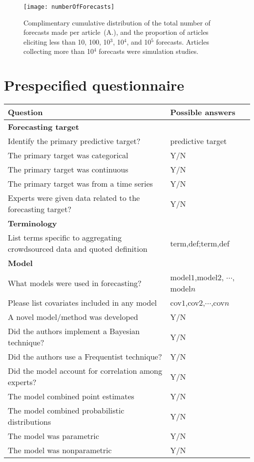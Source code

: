 \documentclass[preprint]{elsarticle}
\begin{document}
\graphicspath{{../_G/F6/}}
\begin{figure*}[ht!]
  \centering
  \texttt{[image: numberOfForecasts]}
  \caption{
Complimentary cumulative distribution of the total number of forecasts made per article~(A.), and 
the proportion of articles eliciting less than 10, 100, 10$^{3}$, 10$^{4}$, and 10$^{5}$ forecasts.
Articles collecting more than 10$^{4}$ forecasts were simulation studies.
  \label{fig.numForecasts}}
\end{figure*}


\appendix
\section{Prespecified questionnaire}
\label{suppl.prespec}

\begin{table*}[ht!]
  \begin{tabular}{ll}
    \hline
    Question & Possible answers\\
    \hline
    \textbf{Forecasting target}\\
    Identify the primary predictive target?      & predictive target\\
    The primary target was categorical           & Y/N \\
    The primary target was continuous            & Y/N \\
    The primary target was from a time series    & Y/N \\
    Experts were given data related to the forecasting target? & Y/N \\

    \textbf{Terminology}\\
    List terms specific to aggregating crowdsourced data and quoted definition & term,def;term,def\\
    
    \textbf{Model}\\
    What models were used in forecasting?        & model$1$,model$2$, $\cdots$, model$n$\\
    Please list covariates included in any model & cov$1$,cov$2$,$\cdots$,cov$n$\\
    A novel model/method was developed                   & Y/N \\
    Did the authors implement a Bayesian technique?      & Y/N \\ 
    Did the authors use a Frequentist technique?         & Y/N\\
    Did the model account for correlation among experts? & Y/N \\
    The model combined point estimates                   & Y/N \\
    The model combined probabilistic distributions       & Y/N \\
    The model was parametric                             & Y/N \\
    The model was nonparametric                          & Y/N \\ 


\end{tabular}
\end{table*}
\end{document}
